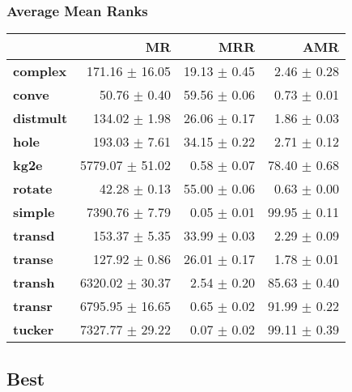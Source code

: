 \documentclass{article}
\begin{document}
    \subsubsection{Average Mean Ranks}
    \begin{center}
    \begin{tabular}{lrrr}
\toprule
{} &               MR &           MRR &           AMR \\
\midrule
\textbf{complex } &   171.16 $\pm$ 16.05 &  19.13 $\pm$ 0.45 &   2.46 $\pm$ 0.28 \\
\textbf{conve   } &     50.76 $\pm$ 0.40 &  59.56 $\pm$ 0.06 &   0.73 $\pm$ 0.01 \\
\textbf{distmult} &    134.02 $\pm$ 1.98 &  26.06 $\pm$ 0.17 &   1.86 $\pm$ 0.03 \\
\textbf{hole    } &    193.03 $\pm$ 7.61 &  34.15 $\pm$ 0.22 &   2.71 $\pm$ 0.12 \\
\textbf{kg2e    } &  5779.07 $\pm$ 51.02 &   0.58 $\pm$ 0.07 &  78.40 $\pm$ 0.68 \\
\textbf{rotate  } &     42.28 $\pm$ 0.13 &  55.00 $\pm$ 0.06 &   0.63 $\pm$ 0.00 \\
\textbf{simple  } &   7390.76 $\pm$ 7.79 &   0.05 $\pm$ 0.01 &  99.95 $\pm$ 0.11 \\
\textbf{transd  } &    153.37 $\pm$ 5.35 &  33.99 $\pm$ 0.03 &   2.29 $\pm$ 0.09 \\
\textbf{transe  } &    127.92 $\pm$ 0.86 &  26.01 $\pm$ 0.17 &   1.78 $\pm$ 0.01 \\
\textbf{transh  } &  6320.02 $\pm$ 30.37 &   2.54 $\pm$ 0.20 &  85.63 $\pm$ 0.40 \\
\textbf{transr  } &  6795.95 $\pm$ 16.65 &   0.65 $\pm$ 0.02 &  91.99 $\pm$ 0.22 \\
\textbf{tucker  } &  7327.77 $\pm$ 29.22 &   0.07 $\pm$ 0.02 &  99.11 $\pm$ 0.39 \\
\bottomrule
\end{tabular}

    \end{center}
    \subsection{Best}
\end{document}
